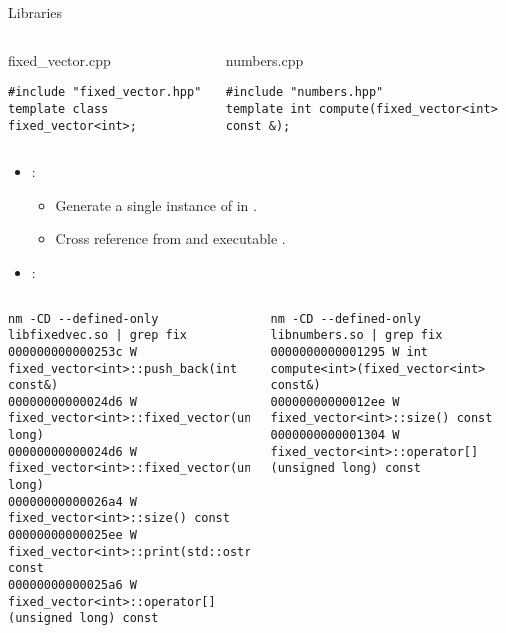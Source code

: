 \begin{frame}[t,fragile]{Libraries}
\begin{columns}[T]

\begin{block}{fixed\_vector.cpp}
\begin{lstlisting}[basicstyle=\tiny]
#include "fixed_vector.hpp"
template class fixed_vector<int>;
\end{lstlisting}
\end{block}

\begin{block}{numbers.cpp}
\begin{lstlisting}[basicstyle=\tiny]
#include "numbers.hpp"
template int compute(fixed_vector<int> const &);
\end{lstlisting}
\end{block}
\end{columns}

\begin{itemize}
  \item {}: 
    \begin{itemize}
      \item Generate a single instance of 
            in .
      \item Cross reference from  and executable .
    \end{itemize}

  \item {}:
\end{itemize}

\begin{columns}[T]

\begin{lstlisting}[style=terminal=escapechar=@,basicstyle=\tiny]
nm -CD --defined-only libfixedvec.so | grep fix
000000000000253c W fixed_vector<int>::push_back(int const&)
00000000000024d6 W fixed_vector<int>::fixed_vector(unsigned long)
00000000000024d6 W fixed_vector<int>::fixed_vector(unsigned long)
00000000000026a4 W fixed_vector<int>::size() const
00000000000025ee W fixed_vector<int>::print(std::ostream&) const
00000000000025a6 W fixed_vector<int>::operator[](unsigned long) const
\end{lstlisting}

\begin{lstlisting}[style=terminal=escapechar=@,basicstyle=\tiny]
nm -CD --defined-only libnumbers.so | grep fix
0000000000001295 W int compute<int>(fixed_vector<int> const&)
00000000000012ee W fixed_vector<int>::size() const
0000000000001304 W fixed_vector<int>::operator[](unsigned long) const
\end{lstlisting}
\end{columns}
\end{frame}

